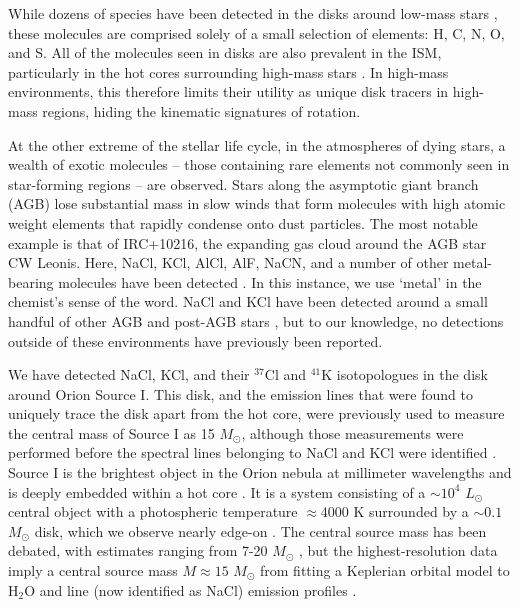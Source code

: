 \documentclass[12pt]{article}
\newcommand{\msun}{\ensuremath{M_{\odot}}\xspace}			%
\newcommand{\lsun}{\ensuremath{L_{\odot}}\xspace}			%
\newcommand{\water}{H$_{2}$O\xspace}		%
\begin{document}
While dozens of species have been detected in the disks around low-mass stars
\cite{McGuire2018c}, these molecules are comprised solely of a small selection
of elements: H, C, N, O, and S.  All of the molecules seen in disks are also
prevalent in the ISM, particularly in the hot cores surrounding high-mass stars
\cite{Nummelin1998a,Belloche2013a}. In high-mass environments, this therefore limits
their utility as unique disk tracers in high-mass regions, hiding the kinematic
signatures of rotation.

At the other extreme of the stellar life cycle, in the atmospheres of dying
stars, a wealth of exotic molecules -- those containing rare elements not
commonly seen in star-forming regions -- are observed.  Stars along the
asymptotic giant branch (AGB) lose substantial mass in slow winds
\cite{Herwig2005a} that form molecules with high atomic weight elements that
rapidly condense onto dust particles.  The most notable example is that of
IRC+10216, the expanding gas cloud around the AGB star CW Leonis.  Here, NaCl,
KCl, AlCl, AlF, NaCN, and a number of other metal-bearing molecules have been
detected \cite{Agundez2012a,Zack2011a}.  In this instance, we use `metal' in
the chemist's sense of the word.  NaCl and KCl have been detected around a
small handful of other AGB and post-AGB stars
\cite{Milam2007a,Highberger2003a,Sanchez-Contreras2018a}, but to our knowledge,
no detections outside of these environments have previously been reported.

We have detected NaCl, KCl, and their $^{37}$Cl and $^{41}$K isotopologues in
the disk around Orion Source I.  This disk, and the emission lines that were
found to uniquely trace the disk apart from the hot core, were previously used
to measure the central mass of Source I as 15 \msun, although those
measurements were performed before the spectral lines belonging to NaCl and KCl
were identified \cite{Ginsburg2018b}.  Source I is the brightest object in the
Orion nebula at millimeter wavelengths and is deeply embedded within a hot core
\cite{}.  It is a system consisting of a $\sim10^4$ \lsun central object with a
photospheric temperature $\approx4000$ K \cite{Testi2010a} surrounded by a
$\sim0.1$ \msun disk, which we observe nearly edge-on \cite{Plambeck2016a}. The
central source mass has been debated, with estimates ranging from 7-20 \msun
\cite{Matthews2010a}, but the highest-resolution data imply a central
source mass $M\approx15$ \msun from fitting a Keplerian orbital model to \water
and line (now identified as NaCl) emission profiles \cite{Ginsburg2018b}.
\end{document}
